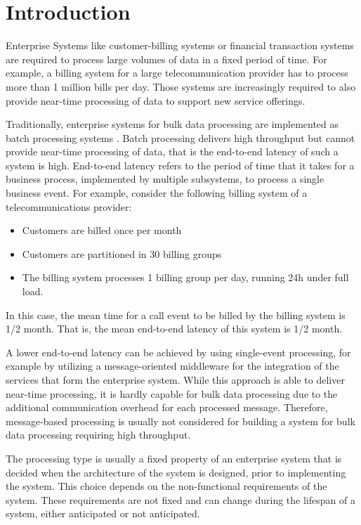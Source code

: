 \chapter{Introduction}\label{ch:introduction}

Enterprise Systems like customer-billing systems or financial transaction systems are required to process large volumes of data in a fixed period of time. For example, a billing system for a large telecommunication provider has to process more than 1 million bills per day.
Those systems are increasingly required to also provide near-time processing of data to support new service offerings.

Traditionally, enterprise systems for bulk data processing are implemented as batch processing systems \citep{Fleck:1999aa}. Batch processing delivers high throughput but cannot provide near-time processing of data, that is the end-to-end latency of such a system is high. End-to-end latency refers to the period of time that it takes for a business process, implemented by multiple subsystems, to process a single business event.  For example, consider the following billing system of a telecommunications provider:
\begin{itemize}
	\item Customers are billed once per month
	\item Customers are partitioned in 30 billing groups
	\item The billing system processes 1 billing group per day, running 24h under full load.
\end{itemize}
In this case, the mean time for a call event to be billed by the billing system is 1/2 month. That is, the mean end-to-end latency of this system is 1/2 month.

A lower end-to-end latency can be achieved by using single-event processing, for example by utilizing a message-oriented middleware for the integration of the services that form the enterprise system. While this approach is able to deliver near-time processing, it is hardly capable for bulk data processing due to the additional communication overhead for each processed message. Therefore, message-based processing is usually not considered for building a system for bulk data processing requiring high throughput.

The processing type is usually a fixed property of an enterprise system that is decided when the architecture of the system is designed, prior to implementing the system. This choice depends on the non-functional requirements of the system. These requirements are not fixed and can change during the lifespan of a system, either anticipated or not anticipated.

